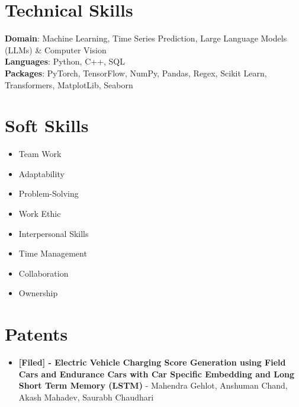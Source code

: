 \documentclass[letterpaper,11pt]{article}
\newcommand{\resumeItem}[1]{
  \item\small{
    {#1 \vspace{-2pt}}
  }
}
\newcommand{\resumeItemListStart}{\begin{itemize}}
\newcommand{\resumeItemListEnd}{\end{itemize}\vspace{-5pt}}
\begin{document}
\section{Technical Skills}
 \begin{itemize}[leftmargin=0.15in, label={}]
    \small{\item{
    \textbf{Domain}{: Machine Learning, Time Series Prediction, Large Language Models (LLMs) \& Computer Vision} \\
     \vspace{4pt}
     \textbf{Languages}{: Python, C++, SQL} \\
     \vspace{4pt}
     \textbf{Packages}{: PyTorch, TensorFlow, NumPy, Pandas, Regex, Scikit Learn, Transformers, MatplotLib, Seaborn} \\
    }}
 \end{itemize}
 
\section{Soft Skills}
    \begin{multicols}{4}
            \begin{itemize}[itemsep=-5pt, parsep=8pt]
                \item Team Work  
                \item Adaptability
                \item Problem-Solving
                \item Work Ethic
                \item Interpersonal Skills
                \item Time Management
                \item Collaboration
                \item Ownership
            \end{itemize}
        \end{multicols}
        \vspace*{2.0\multicolsep}

\section{Patents}
\resumeItemListStart
\resumeItem{\textbf{[Filed] - Electric Vehicle Charging Score Generation using Field Cars and Endurance Cars with Car Specific Embedding and Long Short Term Memory (LSTM)} - Mahendra Gehlot, Anshuman Chand, Akash Mahadev,
Saurabh Chaudhari}
\resumeItemListEnd
\vspace{-8pt}
\end{document}
